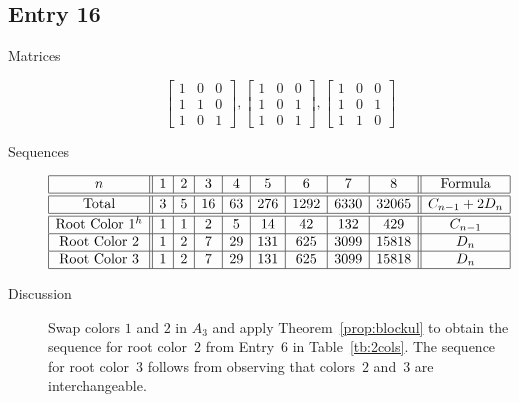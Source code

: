 \documentclass[12pt]{amsart}
\begin{document}
\subsection*{Entry 16}
\begin{description}
    \item[Matrices]
    
    \[\begin{bmatrix}
1 & 0 & 0 \\
1 & 1 & 0 \\
1 & 0 & 1
\end{bmatrix}, \begin{bmatrix}
1 & 0 & 0 \\
1 & 0 & 1 \\
1 & 0 & 1
\end{bmatrix}, \begin{bmatrix}
1 & 0 & 0 \\
1 & 0 & 1 \\
1 & 1 & 0
\end{bmatrix}\]
    \item[Sequences]\hspace*{\fill}\vspace{-0.5cm}
    \begin{center}
        \[
        \begin{array}{|c||c|c|c|c|c|c|c|c||c|}\hline
           n  & 1 & 2 & 3 & 4 & 5 & 6 & 7 & 8  & \text{Formula}\\\hline\hline
           \text{Total}  & 3 & 5 & 16 & 63 & 276 & 1292 & 6330 & 32065 & C_{n-1}+2D_{n}\\\hline\hline
           \text{Root Color }1^{h} & 1 & 1 & 2 & 5 & 14 & 42 & 132 & 429 & C_{n-1}\\\hline
           \text{Root Color }2 & 1 & 2 & 7 & 29 & 131 & 625 & 3099 & 15818 & D_n\\\hline
           \text{Root Color }3 & 1 & 2 & 7 & 29 & 131 & 625 & 3099 & 15818 & D_n\\\hline
        \end{array}
        \]
    \end{center}
    

    \item[Discussion] Swap colors $1$ and $2$ in $A_3$ and apply Theorem~\ref{prop:blockul} to obtain the sequence for root color~$2$ from Entry~6 in Table~\ref{tb:2cols}. The sequence for root color~$3$ follows from observing that colors~$2$ and~$3$ are interchangeable.
\end{description}
\end{document}

